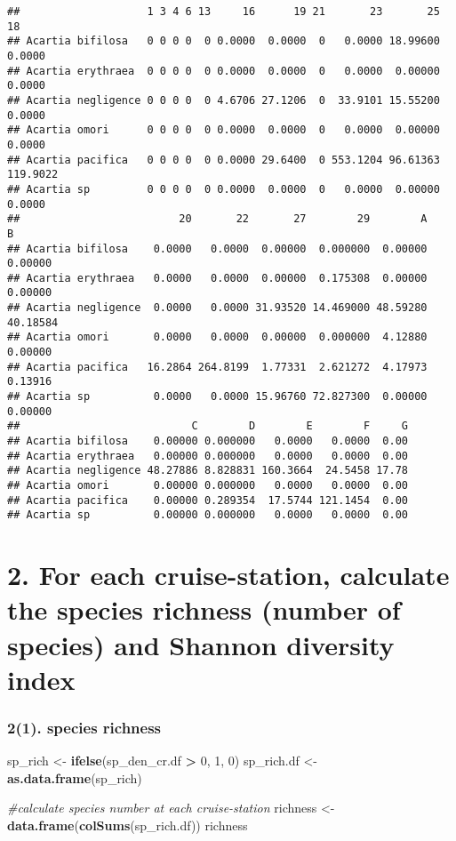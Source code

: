\documentclass[
]{article}
\newenvironment{Shaded}{\begin{snugshade}}{\end{snugshade}}
\newcommand{\CommentTok}[1]{\textcolor[rgb]{0.56,0.35,0.01}{\textit{#1}}}
\newcommand{\DecValTok}[1]{\textcolor[rgb]{0.00,0.00,0.81}{#1}}
\newcommand{\FunctionTok}[1]{\textcolor[rgb]{0.13,0.29,0.53}{\textbf{#1}}}
\newcommand{\NormalTok}[1]{#1}
\newcommand{\OtherTok}[1]{\textcolor[rgb]{0.56,0.35,0.01}{#1}}
\newcommand{\SpecialCharTok}[1]{\textcolor[rgb]{0.81,0.36,0.00}{\textbf{#1}}}
\begin{document}
\begin{verbatim}
##                    1 3 4 6 13     16      19 21       23       25       18
## Acartia bifilosa   0 0 0 0  0 0.0000  0.0000  0   0.0000 18.99600   0.0000
## Acartia erythraea  0 0 0 0  0 0.0000  0.0000  0   0.0000  0.00000   0.0000
## Acartia negligence 0 0 0 0  0 4.6706 27.1206  0  33.9101 15.55200   0.0000
## Acartia omori      0 0 0 0  0 0.0000  0.0000  0   0.0000  0.00000   0.0000
## Acartia pacifica   0 0 0 0  0 0.0000 29.6400  0 553.1204 96.61363 119.9022
## Acartia sp         0 0 0 0  0 0.0000  0.0000  0   0.0000  0.00000   0.0000
##                         20       22       27        29        A        B
## Acartia bifilosa    0.0000   0.0000  0.00000  0.000000  0.00000  0.00000
## Acartia erythraea   0.0000   0.0000  0.00000  0.175308  0.00000  0.00000
## Acartia negligence  0.0000   0.0000 31.93520 14.469000 48.59280 40.18584
## Acartia omori       0.0000   0.0000  0.00000  0.000000  4.12880  0.00000
## Acartia pacifica   16.2864 264.8199  1.77331  2.621272  4.17973  0.13916
## Acartia sp          0.0000   0.0000 15.96760 72.827300  0.00000  0.00000
##                           C        D        E        F     G
## Acartia bifilosa    0.00000 0.000000   0.0000   0.0000  0.00
## Acartia erythraea   0.00000 0.000000   0.0000   0.0000  0.00
## Acartia negligence 48.27886 8.828831 160.3664  24.5458 17.78
## Acartia omori       0.00000 0.000000   0.0000   0.0000  0.00
## Acartia pacifica    0.00000 0.289354  17.5744 121.1454  0.00
## Acartia sp          0.00000 0.000000   0.0000   0.0000  0.00
\end{verbatim}

\section{2. For each cruise-station, calculate the species richness
(number of species) and Shannon diversity
index}\label{for-each-cruise-station-calculate-the-species-richness-number-of-species-and-shannon-diversity-index}

\subsubsection{2(1). species richness}\label{species-richness}

\begin{Shaded}
\begin{Highlighting}[]
\NormalTok{sp\_rich }\OtherTok{\textless{}{-}} \FunctionTok{ifelse}\NormalTok{(sp\_den\_cr.df }\SpecialCharTok{\textgreater{}} \DecValTok{0}\NormalTok{, }\DecValTok{1}\NormalTok{, }\DecValTok{0}\NormalTok{) }
\NormalTok{sp\_rich.df }\OtherTok{\textless{}{-}} \FunctionTok{as.data.frame}\NormalTok{(sp\_rich)}

\CommentTok{\#calculate species number at each cruise{-}station}
\NormalTok{richness }\OtherTok{\textless{}{-}} \FunctionTok{data.frame}\NormalTok{(}\FunctionTok{colSums}\NormalTok{(sp\_rich.df))}
\NormalTok{richness}
\end{Highlighting}
\end{Shaded}
\end{document}
